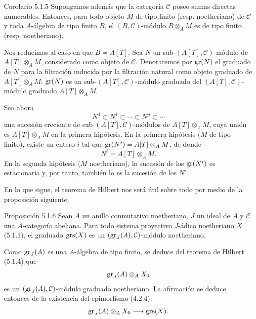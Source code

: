 \begin{statement}{Corolario 5.1.5}
Supongamos además que la categoría \(\mathcal C\) posee sumas directas numerables. Entonces, para todo objeto \(M\) de tipo finito (resp. noetheriano) de \(\mathcal C\) y toda \(A\)-álgebra de tipo finito \(B\), el \((B,\mathcal C)\)-módulo \(B\otimes_A M\) es de tipo finito (resp. noetheriano).
\end{statement}

\begin{prooftext}
Nos reducimos al caso en que \(B=A[T]\). Sea \(N\) un sub-\((A[T],\mathcal C)\)-módulo de \(A[T]\otimes_A M\), considerado como objeto de \(\mathcal C\). Denotaremos por \(\operatorname{gr}(N)\) el graduado de \(N\) para la filtración inducida por la filtración natural como objeto graduado de \(A[T]\otimes_A M\): \(\operatorname{gr}(N)\) es un sub-\((A[T],\mathcal C)\)-módulo graduado del \((A[T],\mathcal C)\)-módulo graduado \(A[T]\otimes_A M\).

Sea ahora
\[
N^0\subset N^1\subset\cdots\subset N^p\subset\cdots
\]
una sucesión creciente de sub-\((A[T],\mathcal C)\)-módulos de \(A[T]\otimes_A M\), cuya unión es \(A[T]\otimes_A M\) en la primera hipótesis. En la primera hipótesis (\(M\) de tipo finito), existe un entero \(i\) tal que \(\operatorname{gr}(N^i)=A[T]\otimes_A M\), de donde
\[
N^i=A[T]\otimes_A M.
\]
En la segunda hipótesis (\(M\) noetheriano), la sucesión de los \(\operatorname{gr}(N^i)\) es estacionaria y, por tanto, también lo es la sucesión de los \(N^i\).

En lo que sigue, el teorema de Hilbert nos será útil sobre todo por medio de la proposición siguiente.
\end{prooftext}

\begin{statement}{Proposición 5.1.6}
Sean \(A\) un anillo conmutativo noetheriano, \(J\) un ideal de \(A\) y \(\mathcal C\) una \(A\)-categoría abeliana. Para todo sistema proyectivo \(J\)-ádico noetheriano \(X\) (5.1.1), el graduado \(\operatorname{grs}(X)\) es un \((\operatorname{gr}_J(A),\mathcal C)\)-módulo noetheriano.
\end{statement}

\begin{prooftext}
Como \(\operatorname{gr}_J(A)\) es una \(A\)-álgebra de tipo finito, se deduce del teorema de Hilbert (5.1.4) que
\[
\operatorname{gr}_J(A)\otimes_A X_0
\]
es un \((\operatorname{gr}_J(A),\mathcal C)\)-módulo graduado noetheriano. La afirmación se deduce entonces de la existencia del epimorfismo (4.2.4):
\[
\operatorname{gr}_J(A)\otimes_A X_0\longrightarrow \operatorname{grs}(X).
\]
\end{prooftext}
